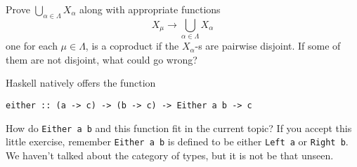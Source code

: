 \begin{exercise}
  Prove \(\bigcup_{\alpha \in \Lambda} X_\alpha\) along with appropriate functions
  \[X_\mu \to \bigcup_{\alpha \in \Lambda} X_\alpha\] one for each
  \(\mu \in \Lambda\), is a coproduct if the \(X_\alpha\)-s are pairwise disjoint. If
  some of them are not disjoint, what could go wrong?
\end{exercise}

\begin{exercise}
  Haskell natively offers the function
  \begin{center} {\tt either :: (a -> c) -> (b -> c) -> Either a b ->
      c}
  \end{center}
  How do {\tt Either a b} and this function fit in the current topic?
  If you accept this little exercise, remember {\tt Either a b} is
  defined to be either {\tt Left a} or {\tt Right b}. We haven't
  talked about the category of types, but it is not be that unseen.
\end{exercise}

